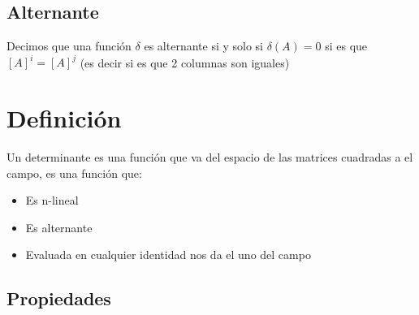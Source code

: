 \documentclass[12pt, fleqn]{report}                             %
\theoremstyle{break}                                            %
\begin{document}
            \vspace{1em}
            \subsection{Alternante}

                Decimos que una función $\delta$ es alternante si y solo si $\delta(A) = 0$
                si es que $[A]^i = [A]^j$ (es decir si es que 2 columnas son iguales)




        \vspace{1em}
        \section{Definición}

            Un determinante es una función que va del espacio de las matrices cuadradas
            a el campo, es una función que:
            \begin{itemize}
                \item Es n-lineal
                \item Es alternante
                \item Evaluada en cualquier identidad nos da el uno del campo
            \end{itemize}




            \clearpage
            \subsection{Propiedades}
\end{document}
